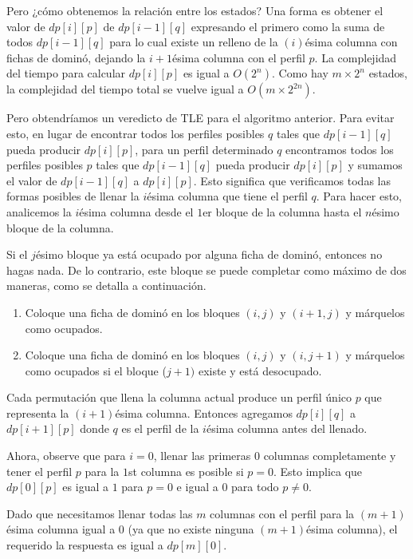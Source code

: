 Pero ¿cómo obtenemos la relación entre los estados? Una forma es obtener el valor de \(dp[i][p]\) de \(dp[i-1][q]\) expresando el primero como la suma de todos \(dp[i-1] [q]\) para lo cual existe un relleno de la \((i)\)ésima columna con fichas de dominó, dejando la \(i+1\)ésima columna con el perfil \(p\). La complejidad del tiempo para calcular \(dp[i][p]\) es igual a \(O(2^n)\). Como hay \(m \times 2^n\) estados, la complejidad del tiempo total se vuelve igual a \(O(m \times 2^{2n})\).


Pero obtendríamos un veredicto de TLE para el algoritmo anterior. Para evitar esto, en lugar de encontrar todos los perfiles posibles \(q\) tales que \(dp[i-1][q]\) pueda producir \(dp[i][p]\), para un perfil determinado \( q\) encontramos todos los perfiles posibles \(p\) tales que \(dp[i-1][q]\) pueda producir \(dp[i][p]\) y sumamos el valor de \(dp[ i-1][q]\) a \(dp[i][p]\). Esto significa que verificamos todas las formas posibles de llenar la \(i\)ésima columna que tiene el perfil \(q\). Para hacer esto, analicemos la \(i\)ésima columna desde el \(1\)er bloque de la columna hasta el \(n\)ésimo bloque de la columna.

Si el \(j\)ésimo bloque ya está ocupado por alguna ficha de dominó, entonces no hagas nada.
De lo contrario, este bloque se puede completar como máximo de dos maneras, como se detalla a continuación.

\begin{enumerate}
	\item Coloque una ficha de dominó en los bloques \((i,j)\) y \((i+1,j)\) y márquelos como ocupados.
	\item Coloque una ficha de dominó en los bloques \((i,j)\) y \((i,j+1)\) y márquelos como ocupados si el bloque (\(j+1)\) existe y está desocupado.
\end{enumerate}

Cada permutación que llena la columna actual produce un perfil único \(p\) que representa la \((i+1)\)ésima columna. Entonces agregamos \(dp[i][q]\) a \(dp[i+1][p]\) donde \(q\) es el perfil de la \(i\)ésima columna antes del llenado.

Ahora, observe que para \(i = 0\), llenar las primeras \(0\) columnas completamente y tener el perfil \(p\) para la \(1\)st columna es posible si \(p = 0\). Esto implica que \(dp[0][p]\) es igual a \(1\) para \(p = 0\) e igual a \(0\) para todo \(p \neq 0\).

Dado que necesitamos llenar todas las \(m\) columnas con el perfil para la \((m+1)\)ésima columna igual a 0 (ya que no existe ninguna \((m+1)\)ésima columna), el requerido la respuesta es igual a \(dp[m][0]\).